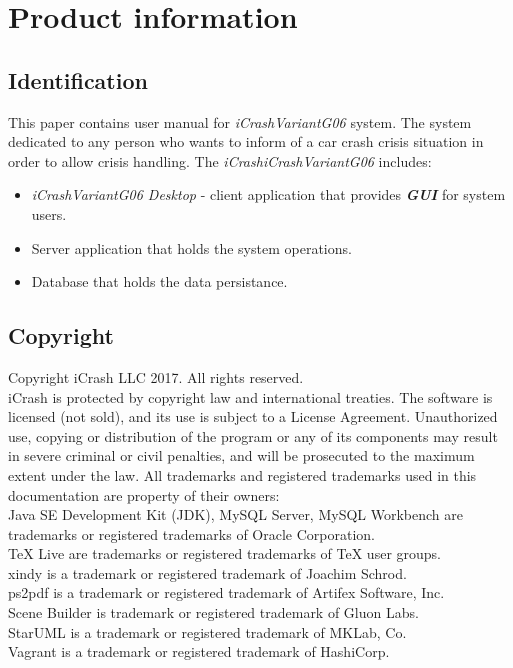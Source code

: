 \chapter{Product information}
\vspace{-6em}


\section{Identification}
This paper contains user manual for \emph{iCrashVariantG06} system. The system
dedicated to any person who wants to inform of a car crash crisis situation in
order to allow crisis handling. The \emph{iCrashiCrashVariantG06} includes:
\begin{itemize}
  \item  \emph{iCrashVariantG06 Desktop} - client application that
  provides \textbf{\emph{\gls{GUI}}} for system users.
  \item Server application that holds the system operations.
  \item Database that holds the data persistance.
\end{itemize}

\section{Copyright}

Copyright iCrash LLC 2017. All rights reserved.\\
iCrash is protected by copyright law and international treaties. The software is
licensed (not sold), and its use is subject to a License Agreement. Unauthorized
use, copying or distribution of the program or any of its components may result in severe criminal or civil penalties, and will be prosecuted to the maximum extent under the law.
All trademarks and registered trademarks used in this documentation are property
of their owners:\\
Java SE Development Kit (JDK), MySQL Server, MySQL Workbench are trademarks or
registered trademarks of Oracle Corporation.\\
TeX Live are trademarks or registered trademarks of TeX user groups.\\
xindy is a trademark or registered trademark of Joachim Schrod. \\
ps2pdf  is a trademark or registered trademark of Artifex Software, Inc.\\
Scene Builder is trademark or registered trademark of Gluon Labs.\\
StarUML is a trademark or registered trademark of MKLab, Co.\\
Vagrant is a trademark or registered trademark of HashiCorp.\\


